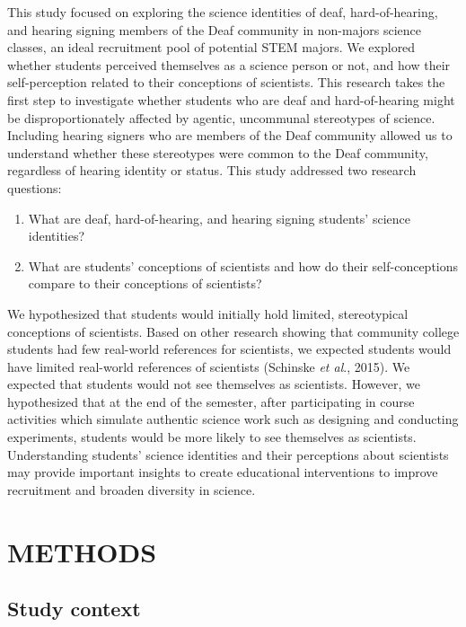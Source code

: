 \documentclass[11.5pt]{sig-alternate} %
\begin{document}
\begin{large}
This study focused on exploring the science identities of deaf, hard-of-hearing, and hearing signing members of the Deaf community in non-majors science classes, an ideal recruitment pool of potential STEM majors. We explored whether students perceived themselves as a science person or not, and how their self-perception related to their conceptions of scientists. This research takes the first step to investigate whether students who are deaf and hard-of-hearing might be disproportionately affected by agentic, uncommunal stereotypes of science. Including hearing signers who are members of the Deaf community allowed us to understand whether these stereotypes were common to the Deaf community, regardless of hearing identity or status. This study addressed two research questions:
 \begin{enumerate}
     \item What are deaf, hard-of-hearing, and hearing signing students’ science identities?
     \item What are students’ conceptions of scientists and how do their self-conceptions compare to their conceptions of scientists?
 \end{enumerate}
 
We hypothesized that students would initially hold limited, stereotypical conceptions of scientists. Based on other research showing that community college students had few real-world references for scientists, we expected students would have limited real-world references of scientists (Schinske \textit{et al}., 2015). We expected that students would not see themselves as scientists. However, we hypothesized that at the end of the semester, after participating in course activities which simulate authentic science work such as designing and conducting experiments, students would be more likely to see themselves as scientists. Understanding students’ science identities and their perceptions about scientists may provide important insights to create educational interventions to improve recruitment and broaden diversity in science. 

\section*{METHODS}

\subsection*{Study context}


\end{large}
\end{document}
